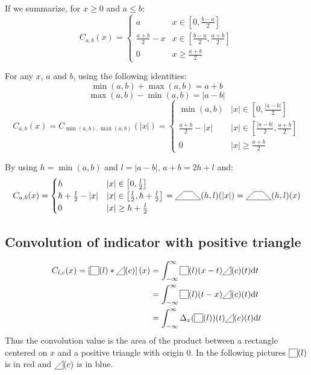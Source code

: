 \documentclass[a4paper,10pt]{article}
\newcommand\Shifted[2]{\Delta_{#1}(#2)}
\newcommand\SymSquare{\begin{tikzpicture}[baseline=0.5ex]%
        \draw (0,0) -- (0,1em) -- (1em,1em) -- (1em,0) -- cycle;
\end{tikzpicture}}
\newcommand\Indicator[1]{\SymSquare(#1)}
\newcommand\SymPositiveTriangle{\begin{tikzpicture}[baseline=0.5ex]%
        \draw (0,0) -- (1em,0em) -- (1em,1em) -- cycle;
\end{tikzpicture}}
\newcommand\PositiveTriangle[1]{\SymPositiveTriangle(#1)}
\newcommand\SymTrapezoid{\begin{tikzpicture}[baseline=0.5ex]%
        \draw (0,0) -- (3em,0) -- (2em,1em) -- (1em,1em) -- cycle;
\end{tikzpicture}}
\newcommand\Trapezoid[2]{\SymTrapezoid(#1,#2)}%
\newcommand\D{\mathrm{d}}
\newcommand\Convolution{\ast}
\newcommand\IntR[2]{\int_{-\infty}^{\infty}#1 \D#2}
\begin{document}
If we summarize, for $x \ge 0$ and $a \le b$:
\[ C_{a,b}(x) = \begin{cases}
    a & x \in \left[ 0, \frac{b-a}{2} \right] \\
    \frac{a+b}{2} - x & x \in \left[ \frac{b-a}{2}, \frac{a+b}{2} \right] \\
    0 & x \ge \frac{a+b}{2}
\end{cases} \]

For any $x$, $a$ and $b$, using the following identities:
\[ \min(a,b) + \max(a,b) = a + b \]
\[ \max(a,b) - \min(a,b) = |a - b| \]
\[ C_{a,b}(x) = C_{\min(a,b),\max(a,b)}(|x|) = \begin{cases}
    \min(a,b) & |x| \in \left[0, \frac{|a-b|}{2} \right] \\
    \frac{a+b}{2} - |x| & |x| \in \left[ \frac{|a-b|}{2}, \frac{a+b}{2} \right] \\
    0 & |x| \ge \frac{a+b}{2}
\end{cases} \]

By using $h = \min(a,b)$ and $l = |a-b|$, $a+b=2h+l$ and:
\[ C_{a,b}(x) = \begin{cases}
    h & |x| \in \left[0, \frac{l}{2} \right] \\
    h+\frac{l}{2} - |x| & |x| \in \left[ \frac{l}{2}, h+\frac{l}{2} \right] \\
    0 & |x| \ge h+\frac{l}{2}
\end{cases} = \Trapezoid{h}{l}(|x|) = \Trapezoid{h}{l}(x) \]

\subsection{Convolution of indicator with positive triangle}\label{proof_convolution_indicator_triangle}
\[ \begin{split}
    C_{l,c}(x) = \left[ \Indicator{l} \Convolution \PositiveTriangle{c} \right] (x) & = \IntR{\Indicator{l}(x-t) \PositiveTriangle{c}(t)}{t} \\
    & = \IntR{\Indicator{l}(t-x) \PositiveTriangle{c}(t)}{t} \\
    & = \IntR{\Shifted{x}{\Indicator{l}}(t) \PositiveTriangle{c}(t)}{t}
\end{split} \]
Thus the convolution value is the area of the product between a rectangle centered on $x$ and a positive triangle with origin $0$.
In the following pictures $\Indicator{l}$ is in red and $\PositiveTriangle{c}$ is in blue.
\end{document}
